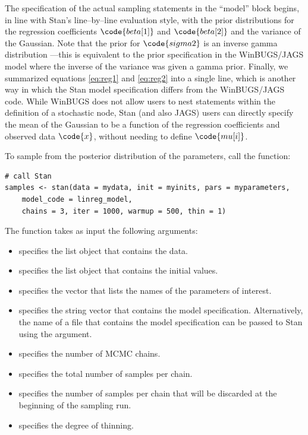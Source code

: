 The specification of the actual sampling statements in the ``model'' block begins, in line with Stan's line--by--line evaluation style, with the prior distributions for the regression coefficients $\code{beta[1]}$ and $\code{beta[2]}$ and the variance of the Gaussian. Note that the prior for $\code{sigma2}$ is an inverse gamma distribution%
---this is equivalent to the prior specification in the WinBUGS/JAGS model where the inverse of the variance was given a gamma prior. Finally, we summarized equations \ref{eq:reg1} and \ref{eq:reg2} into a single line, which is another way in which the Stan model specification differs from the WinBUGS/JAGS code. While WinBUGS does not allow users to nest statements within the definition of a stochastic node, Stan (and also JAGS) users can directly specify the mean of the Gaussian to be a function of the regression coefficients and observed data $\code{x}$, without needing to define $\code{mu[i]}$.

To sample from the posterior distribution of the parameters, call the  function:

\begin{lstlisting}
# call Stan
samples <- stan(data = mydata, init = myinits, pars = myparameters,
    model_code = linreg_model,
    chains = 3, iter = 1000, warmup = 500, thin = 1)
\end{lstlisting}

\noindent The  function takes as input the following arguments:
\begin{itemize}
\item {} specifies the list object that contains the data.
\item {} specifies the list object that contains the initial values.
\item {} specifies the vector that lists the names of the parameters of interest.
\item {} specifies the string vector that contains the model specification. Alternatively, the name of a  file that contains the model specification can be passed to Stan using the  argument.
\item {} specifies the number of MCMC chains.
\item {} specifies the total number of samples per chain.
\item {} specifies the number of samples per chain that will be discarded at the beginning of the sampling run.
\item {} specifies the degree of thinning.
\end{itemize}

